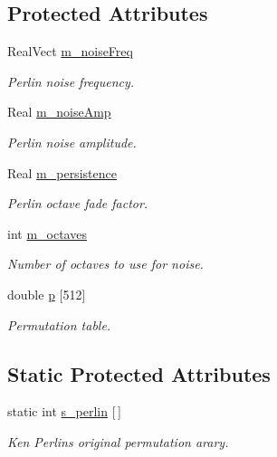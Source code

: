 \subsection*{Protected Attributes}
\begin{DoxyCompactItemize}
\item 
Real\+Vect \hyperlink{classperlin__if_a191064c64ba2b9e10d0700b2267e3b08}{m\+\_\+noise\+Freq}
\begin{DoxyCompactList}\small\item\em Perlin noise frequency. \end{DoxyCompactList}\item 
Real \hyperlink{classperlin__if_a493e56c484dbde6929507ed826f5aa2a}{m\+\_\+noise\+Amp}
\begin{DoxyCompactList}\small\item\em Perlin noise amplitude. \end{DoxyCompactList}\item 
Real \hyperlink{classperlin__if_af7f483571f4b422f2d738cfd22ef9939}{m\+\_\+persistence}
\begin{DoxyCompactList}\small\item\em Perlin octave fade factor. \end{DoxyCompactList}\item 
int \hyperlink{classperlin__if_a145abad7a7e328ac2443bc018a70c161}{m\+\_\+octaves}
\begin{DoxyCompactList}\small\item\em Number of octaves to use for noise. \end{DoxyCompactList}\item 
double \hyperlink{classperlin__if_a4779b048464aa65904c54a5507dd873d}{p} \mbox{[}512\mbox{]}
\begin{DoxyCompactList}\small\item\em Permutation table. \end{DoxyCompactList}\end{DoxyCompactItemize}
\subsection*{Static Protected Attributes}
\begin{DoxyCompactItemize}
\item 
static int \hyperlink{classperlin__if_a2a43aaafd08ae4216f9e89cf4d560e64}{s\+\_\+perlin} \mbox{[}$\,$\mbox{]}
\begin{DoxyCompactList}\small\item\em Ken Perlin\textquotesingle{}s original permutation arary. \end{DoxyCompactList}\end{DoxyCompactItemize}


